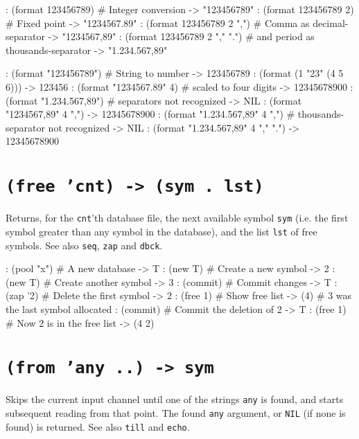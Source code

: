 \begin{wideverbatim}
: (format 123456789)                   # Integer conversion
-> "123456789"
: (format 123456789 2)                 # Fixed point
-> "1234567.89"
: (format 123456789 2 ",")             # Comma as decimal-separator
-> "1234567,89"
: (format 123456789 2 "," ".")         # and period as thousands-separator
-> "1.234.567,89"

: (format "123456789")                 # String to number
-> 123456789
: (format (1 "23" (4 5 6)))
-> 123456
: (format "1234567.89" 4)              # scaled to four digits
-> 12345678900
: (format "1.234.567,89")              # separators not recognized
-> NIL
: (format "1234567,89" 4 ",")
-> 12345678900
: (format "1.234.567,89" 4 ",")        # thousands-separator not recognized
-> NIL
: (format "1.234.567,89" 4 "," ".")
-> 12345678900
\end{wideverbatim}

 
\section*{\texttt{(free 'cnt) -> (sym . lst)}}
\label{sec:func-ref-F-(free 'cnt) -> (sym . lst)}


Returns, for the \texttt{cnt}'th database file, the next available symbol \texttt{sym}
(i.e. the first symbol greater than any symbol in the database), and the
list \texttt{lst} of free symbols. See also \texttt{seq}, \texttt{zap} and \texttt{dbck}.


\begin{wideverbatim}
: (pool "x")      # A new database
-> T
: (new T)         # Create a new symbol
-> {2}
: (new T)         # Create another symbol
-> {3}
: (commit)        # Commit changes
-> T
: (zap '{2})      # Delete the first symbol
-> {2}
: (free 1)        # Show free list
-> ({4})          # {3} was the last symbol allocated
: (commit)        # Commit the deletion of {2}
-> T
: (free 1)        # Now {2} is in the free list
-> ({4} {2})
\end{wideverbatim}

 
\section*{\texttt{(from 'any ..) -> sym}}
\label{sec:func-ref-F-(from 'any ..) -> sym}


Skips the current input channel until one of the strings \texttt{any} is found,
and starts subsequent reading from that point. The found \texttt{any} argument,
or \texttt{NIL} (if none is found) is returned. See also \texttt{till} and \texttt{echo}.


